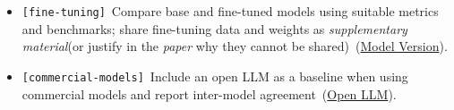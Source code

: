 \documentclass[smallextended]{svjour3}
\makeatletter
\newcommand{\should}{\textbf{should}\xspace}
\newcommand{\paper}{\emph{paper}\xspace}
\newcommand{\supplementarymaterial}{\emph{supplementary material}\xspace}
\newcommand{\paper}{\emph{paper}\xspace}
\newcommand{\supplementarymaterial}{\emph{supplementary material}\xspace}
\newcommand{\iconS}{\usebox{\iconSbox}\xspace}
\newcommand{\iconS}{○\xspace}
\newcommand{\condition}[1]{\texttt{\small[#1]}\,}
\newcommand{\condition}[1]{@@cond:#1@@}
\newcommand{\refmodelversion}{\hyperref[sec:report-model-version-configuration-and-customizations]{Model Version}}
\newcommand{\refopenllm}{\hyperref[sec:use-an-open-llm-as-a-baseline]{Open LLM}}
\newcommand{\refmodelversion}{\href{/guidelines/model-version/}{Model Version}}
\newcommand{\refopenllm}{\href{/guidelines/open-llm/}{Open LLM}}
\makeatother
\begin{document}
\begin{appendices}
\begin{itemize}[label={},leftmargin=*]
    \item \iconS \condition{fine-tuning} Compare base and fine-tuned models using suitable metrics and benchmarks; share fine-tuning data and weights as \supplementarymaterial (or justify in the \paper why they cannot be shared)~(\refmodelversion).
    \item \iconS \condition{commercial-models} Include an open LLM as a baseline when using commercial models and report inter-model agreement~(\refopenllm).
\end{itemize}


\end{appendices}
\end{document}
